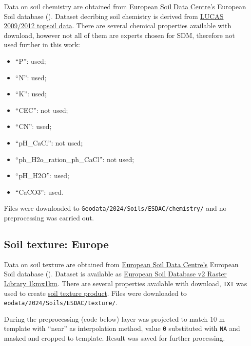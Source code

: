 \documentclass[
]{book}
\newcommand{\passthrough}[1]{#1}
\begin{document}
Data on soil chemistry are obtained from \href{https://esdac.jrc.ec.europa.eu/}{European Soil Data Centre's} European
Soil database (). Dataset decribing soil chemistry is derived from \href{https://esdac.jrc.ec.europa.eu/content/chemical-properties-european-scale-based-lucas-topsoil-data}{LUCAS
2009/2012 topsoil data}. There are several chemical properties available with
download, however not all of them are experts chosen for SDM, therefore not used
further in this work:

\begin{itemize}
\item
  ``P'': used;
\item
  ``N'': used;
\item
  ``K'': used;
\item
  ``CEC'': not used;
\item
  ``CN'': used;
\item
  ``pH\_CaCl'': not used;
\item
  ``ph\_H2o\_ration\_ph\_CaCl'': not used;
\item
  ``pH\_H2O'': used;
\item
  ``CaCO3'': used.
\end{itemize}

Files were downloaded to \passthrough{\lstinline!Geodata/2024/Soils/ESDAC/chemistry/!} and no preprocessing
was carried out.

\subsection{Soil texture: Europe}\label{Ch04.07.02}

Data on soil texture are obtained from \href{https://esdac.jrc.ec.europa.eu/}{European Soil Data Centre's} European
Soil database (). Dataset is available as \href{https://esdac.jrc.ec.europa.eu/content/european-soil-database-v2-raster-library-1kmx1km}{European Soil Database v2 Raster Library 1kmx1km}. There
are several properties available with download, \passthrough{\lstinline!TXT!} was used to
create \hyperref[Ch05.02]{soil texture product}. Files were downloaded to \passthrough{\lstinline!eodata/2024/Soils/ESDAC/texture/!}.

During the preprocessing (code below) layer was
projected to match 10 m template with ``near'' as interpolation method, value \passthrough{\lstinline!0!}
substituted with \passthrough{\lstinline!NA!} and masked and cropped to template. Result was saved for further
processing.
\end{document}
